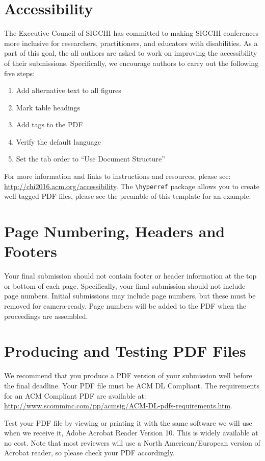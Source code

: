 \documentclass{sigchi}
\begin{document}
\section{Accessibility}
The Executive Council of SIGCHI has committed to making SIGCHI
conferences more inclusive for researchers, practitioners, and
educators with disabilities. As a part of this goal, the all authors
are asked to work on improving the accessibility of their
submissions. Specifically, we encourage authors to carry out the
following five steps:
\begin{enumerate}
\item Add alternative text to all figures
\item Mark table headings
\item Add tags to the PDF
\item Verify the default language
\item Set the tab order to ``Use Document Structure''
\end{enumerate}
For more information and links to instructions and resources, please
see: \url{http://chi2016.acm.org/accessibility}.  The
\texttt{{\textbackslash}hyperref} package allows you to create well tagged PDF files,
please see the preamble of this template for an example.

\section{Page Numbering, Headers and Footers}
Your final submission should not contain footer or header information
at the top or bottom of each page. Specifically, your final submission
should not include page numbers. Initial submissions may include page
numbers, but these must be removed for camera-ready. Page numbers will
be added to the PDF when the proceedings are assembled.

\section{Producing and Testing PDF Files}

We recommend that you produce a PDF version of your submission well
before the final deadline.  Your PDF file must be ACM DL
Compliant. The requirements for an ACM Compliant PDF are available at:
{\url{http://www.scomminc.com/pp/acmsig/ACM-DL-pdfs-requirements.htm}}.

Test your PDF file by viewing or printing it with the same software we
will use when we receive it, Adobe Acrobat Reader Version 10. This is
widely available at no cost. Note that most
reviewers will use a North American/European version of Acrobat
reader, so please check your PDF accordingly.
\end{document}
